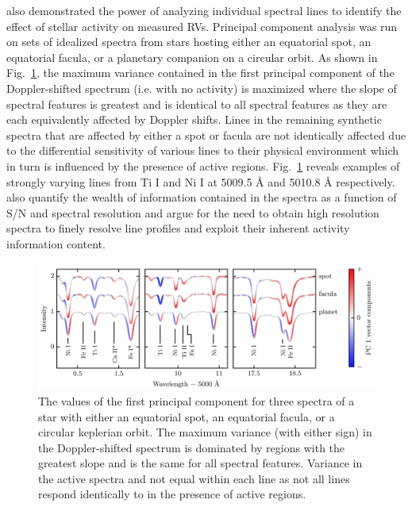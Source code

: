 \cite{davis17} also demonstrated the power of analyzing individual spectral lines
to identify the effect of stellar activity on measured RVs. Principal component analysis
was run on sets of idealized spectra from stars hosting either an equatorial spot,
an equatorial facula, or a planetary companion on a circular orbit. As shown in
Fig.~\ref{fig:pca}, the maximum variance contained in the first principal component
of the Doppler-shifted spectrum (i.e. with no activity) is maximized where the slope
of spectral features is greatest and is identical to all spectral features as they
are each equivalently affected by Doppler shifts. Lines in the remaining synthetic
spectra that are affected by either a spot or facula are not identically affected due
to the differential sensitivity of various lines to their physical environment
which in turn is influenced by the presence of active regions. Fig.~\ref{fig:pca}
reveals examples of strongly varying lines from Ti \footnotesize I \normalsize and Ni
\footnotesize I \normalsize at 5009.5 \AA{} and 5010.8 \AA{} respectively.
\cite{davis17} also quantify the wealth of information contained in the spectra
as a function of S/N and spectral resolution and argue for the need to obtain
high resolution spectra to finely resolve line profiles and exploit their inherent
activity information content.

\begin{figure}
  \centering
  \includegraphics[width=\hsize]{figures/pca.png}
  \caption[Principal component analysis of idealized spectra containing either spots, faculae, or planets.]
          {The values of the first principal component for three spectra of a star with either an equatorial
            spot, an equatorial facula, or a circular keplerian orbit. The maximum variance (with either sign)
            in the Doppler-shifted spectrum is dominated by regions with the greatest slope and is the same
            for all spectral features. Variance in the active spectra and not equal within each line as not all
            lines respond identically to in the presence of active regions. \citep[Image credit:][]{davis17}}
  \label{fig:pca}
\end{figure}


